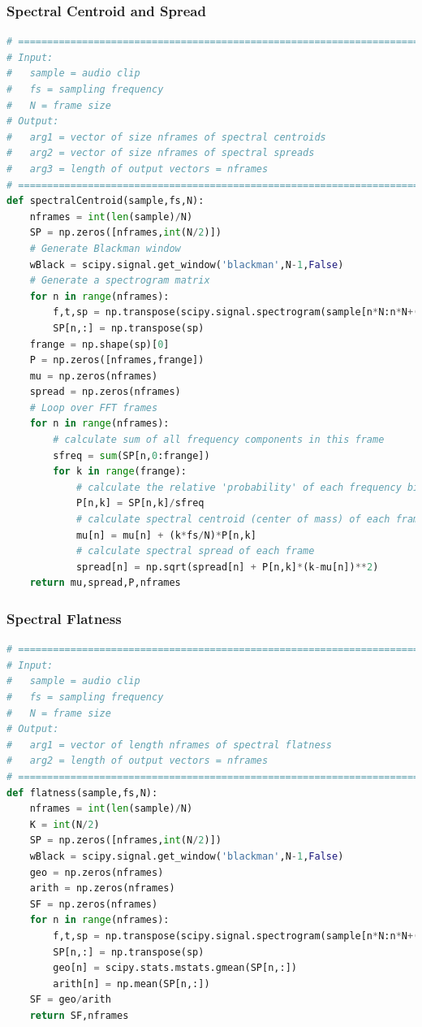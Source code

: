 \documentclass[11pt,a4paper]{article}
\begin{document}
		\subsubsection{Spectral Centroid and Spread} \label{app:centroidspread}
			\begin{lstlisting}[language=Python,label={lst:centroidspread}]
# =============================================================================
# Input:
#   sample = audio clip
#   fs = sampling frequency
#   N = frame size
# Output:
#   arg1 = vector of size nframes of spectral centroids
#   arg2 = vector of size nframes of spectral spreads
#   arg3 = length of output vectors = nframes
# =============================================================================
def spectralCentroid(sample,fs,N):
    nframes = int(len(sample)/N)
    SP = np.zeros([nframes,int(N/2)])
    # Generate Blackman window
    wBlack = scipy.signal.get_window('blackman',N-1,False)
    # Generate a spectrogram matrix
    for n in range(nframes):
        f,t,sp = np.transpose(scipy.signal.spectrogram(sample[n*N:n*N+(N-1)],fs,wBlack,mode='magnitude'))
        SP[n,:] = np.transpose(sp)
    frange = np.shape(sp)[0]
    P = np.zeros([nframes,frange])
    mu = np.zeros(nframes)
    spread = np.zeros(nframes)
    # Loop over FFT frames
    for n in range(nframes):
        # calculate sum of all frequency components in this frame
        sfreq = sum(SP[n,0:frange])
        for k in range(frange):
            # calculate the relative 'probability' of each frequency bin
            P[n,k] = SP[n,k]/sfreq
            # calculate spectral centroid (center of mass) of each frame
            mu[n] = mu[n] + (k*fs/N)*P[n,k]
            # calculate spectral spread of each frame
            spread[n] = np.sqrt(spread[n] + P[n,k]*(k-mu[n])**2)
    return mu,spread,P,nframes
		\end{lstlisting}
		
\pagebreak
	\subsubsection{Spectral Flatness} \label{app:flatness}
		\begin{lstlisting}[language=Python,label={lst:flatness}]
# =============================================================================
# Input:
#   sample = audio clip
#   fs = sampling frequency
#   N = frame size
# Output:
#   arg1 = vector of length nframes of spectral flatness
#   arg2 = length of output vectors = nframes
# =============================================================================
def flatness(sample,fs,N):
    nframes = int(len(sample)/N)
    K = int(N/2)
    SP = np.zeros([nframes,int(N/2)])
    wBlack = scipy.signal.get_window('blackman',N-1,False)
    geo = np.zeros(nframes)
    arith = np.zeros(nframes)
    SF = np.zeros(nframes)
    for n in range(nframes):
        f,t,sp = np.transpose(scipy.signal.spectrogram(sample[n*N:n*N+(N-1)],fs,wBlack,mode='magnitude'))
        SP[n,:] = np.transpose(sp)
        geo[n] = scipy.stats.mstats.gmean(SP[n,:])
        arith[n] = np.mean(SP[n,:])
    SF = geo/arith
    return SF,nframes
		\end{lstlisting}
\end{document}
